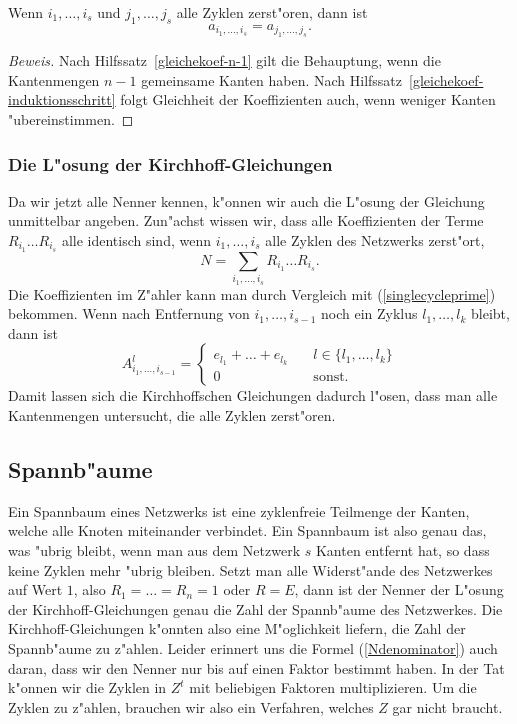 \begin{satz}
Wenn $i_1,\dots,i_s$ und $j_1,\dots,j_s$ alle Zyklen zerst"oren,
dann ist 
\[
a_{i_1,\dots,i_s}=a_{j_1,\dots,j_s}.
\]
\end{satz}

\begin{proof}[Beweis]
Nach Hilfssatz~\ref{gleichekoef-n-1} gilt die Behauptung, wenn die Kantenmengen
$n-1$ gemeinsame Kanten haben.
Nach Hilfssatz~\ref{gleichekoef-induktionsschritt} folgt Gleichheit der
Koeffizienten auch, wenn weniger Kanten "ubereinstimmen.
\end{proof}

\subsubsection{Die L"osung der Kirchhoff-Gleichungen}
Da wir jetzt alle Nenner kennen, k"onnen wir auch die L"osung
der Gleichung unmittelbar angeben.
Zun"achst wissen wir, dass alle Koeffizienten der Terme
$R_{i_1}\dots R_{i_s}$ alle identisch sind, wenn $i_1,\dots,i_s$
alle Zyklen des Netzwerks zerst"ort,
\[
N =\sum_{i_1,\dots,i_s}R_{i_1}\dots R_{i_s}.
\]
Die Koeffizienten im Z"ahler kann man durch Vergleich
mit (\ref{singlecycleprime}) bekommen. Wenn nach Entfernung
von $i_1,\dots,i_{s-1}$ noch ein Zyklus $l_1,\dots,l_k$ bleibt, dann
ist
\[
A_{i_1,\dots,i_{s-1}}^l=\begin{cases}
e_{l_1}+\dots+e_{l_k}&\quad l\in\{l_1,\dots,l_k\}\\
0&\quad \text{sonst.}
\end{cases}
\]
Damit lassen sich die Kirchhoffschen Gleichungen dadurch l"osen,
dass man alle Kantenmengen untersucht, die alle Zyklen zerst"oren.

\subsection{Spannb"aume}
Ein Spannbaum eines Netzwerks ist eine zyklenfreie Teilmenge der Kanten,
welche alle Knoten miteinander verbindet.
Ein Spannbaum ist also genau das, was "ubrig bleibt, wenn man aus dem
Netzwerk $s$ Kanten entfernt hat, so dass keine Zyklen mehr "ubrig bleiben.
Setzt man alle Widerst"ande des Netzwerkes auf Wert $1$, also
$R_1=\dots=R_n=1$ oder $R=E$,
dann ist der Nenner der L"osung der Kirchhoff-Gleichungen
genau die Zahl der Spannb"aume des Netzwerkes. Die Kirchhoff-Gleichungen
k"onnten also eine M"oglichkeit liefern, die Zahl der Spannb"aume
zu z"ahlen. 
Leider erinnert uns die Formel (\ref{Ndenominator}) auch daran, dass  
wir den Nenner nur bis auf einen Faktor bestimmt haben. In der
Tat k"onnen wir die Zyklen in $Z^t$ mit beliebigen Faktoren
multiplizieren. Um die Zyklen zu z"ahlen, brauchen wir also
ein Verfahren, welches $Z$ gar nicht braucht.

